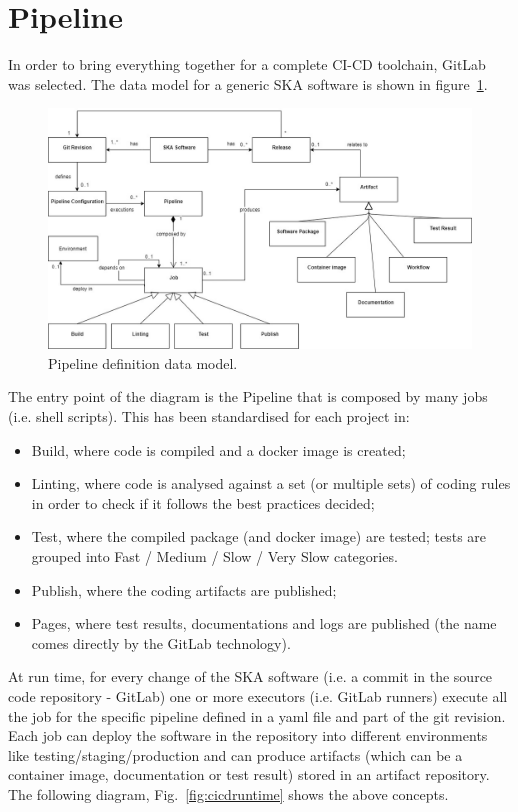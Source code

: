 \documentclass[a4paper]{spie}  %
\begin{document}
\section{Pipeline} \label{pipeline}

In order to bring everything together for a complete CI-CD toolchain, GitLab~\cite{gitlab} was selected. The data model for a generic SKA software is shown in figure~\ref{fig:pipelinedatamodel}.

\begin{figure}[!htb]
   \centering
   \includegraphics*[width=0.8\columnwidth]{dataEntity}
   \caption{Pipeline definition data model.}
   \label{fig:pipelinedatamodel}
\end{figure}

The entry point of the diagram is the Pipeline that is composed by many jobs (i.e. shell scripts). This has been standardised for each project in:
\begin{itemize}
    \item Build, where code is compiled and a docker image is created;
    \item Linting, where code is analysed against a set (or multiple sets) of coding rules in order to check if it follows the best practices decided;
    \item Test, where the compiled package (and docker image) are tested; tests are grouped into Fast / Medium / Slow / Very Slow categories.
    \item Publish, where the coding artifacts are published;
    \item Pages, where test results, documentations and logs are published (the name comes directly by the GitLab technology).
\end{itemize}

At run time, for every change of the SKA software (i.e. a commit in the source code repository - GitLab) one or more executors (i.e. GitLab runners) execute all the job for the specific pipeline defined in a yaml file and part of the git revision. Each job can deploy the software in the repository into different environments like testing/staging/production and can produce artifacts (which can be a container image, documentation or test result) stored in an artifact repository. The following diagram, Fig.~\ref{fig:cicdruntime} shows the above concepts.
\end{document}
